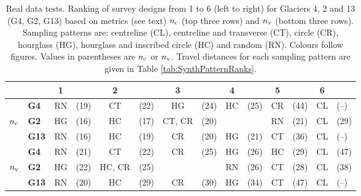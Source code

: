 \documentclass{article}
\begin{document}
\begin{table}[]
\centering
\caption{Real data tests. Ranking of survey designs from 1 to 6 (left to right) for Glaciers 4, 2 and 13 (G4, G2, G13) based on metrics (see text) $n_{\rm c}$ (top three rows) and $n_{\rm v}$ (bottom three rows). Sampling patterns are: centreline (CL), centreline and transverse (CT), circle (CR), hourglass (HG), hourglass and inscribed circle (HC) and random (RN). Colours follow figures. Values in parentheses are $n_{\rm c}$ or $n_{\rm v}$. Travel distances for each sampling pattern are given in Table \ref{tab:SynthPatternRanks}.}
\label{tab:RealPatternRanks}
\begin{tabular}{clclclclclclcl}
\hline
          && \textbf{1} && \textbf{2} && \textbf{3} && \textbf{4} && \textbf{5} && \textbf{6} \\
 \hline
                & \textbf{G4}   & \textcolor{RN}{RN}         & (19) & \textcolor{CT}{CT}         & (22)         &  \textcolor{HG}{HG}        &  (24)        & \textcolor{HC}{HC}         & (25)           &  \textcolor{CR}{CR}        & (44) & \textcolor{CL}{CL} & (--) \\
$n_{\rm c}$         & \textbf{G2}   & \textcolor{HG}{HG}         & (16)         &  \textcolor{HC}{HC}        &  (17)          & \textcolor{CT}{CT}, \textcolor{CR}{CR}        & (20)         &          &          & \textcolor{RN}{RN}         & (21) & \textcolor{CL}{CL} & (29) \\
                & \textbf{G13} & \textcolor{RN}{RN}         & (16)         & \textcolor{HC}{HC} & (19)         & \textcolor{CR}{CR}                 & (20)         &           \textcolor{HG}{HG}        &   (21)        & \textcolor{CT}{CT}         & (36) & \textcolor{CL}{CL} & (--) \\
\hline
                & \textbf{G4}   & \textcolor{RN}{RN}         & (21)         &   \textcolor{CT}{CT}        &  (22)         & \textcolor{CR}{CR}         & (25)         & \textcolor{HG}{HG}                 & (26)         & \textcolor{HC}{HC} & (29) & \textcolor{CL}{CL} & (47) \\
$n_{\rm v}$         & \textbf{G2}   & \textcolor{HG}{HG}         & (22)         & \textcolor{HC}{HC}, \textcolor{CR}{CR}         & (25)         &            &         &  \textcolor{RN}{RN}                & (26)        &  \textcolor{CT}{CT}         & (28) & \textcolor{CL}{CL} & (38) \\
                & \textbf{G13} & \textcolor{RN}{RN}         & (20)         & \textcolor{HC}{HC}         & (29)         & \textcolor{CR}{CR}                 & (30)         &  \textcolor{HG}{HG}        & (34)         & \textcolor{CT}{CT}         & (47) & \textcolor{CL}{CL} & (--) \\
\hline                
\end{tabular}
\end{table}
\end{document}
